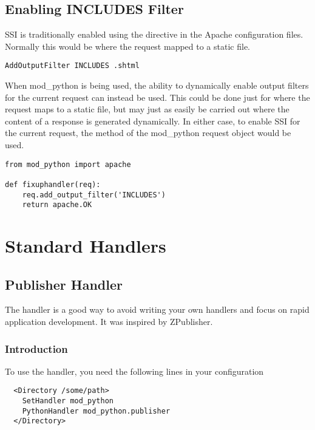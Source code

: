 \section{Enabling INCLUDES Filter\label{ssi-output-filter}}

SSI is traditionally enabled using the  directive in
the Apache configuration files. Normally this would be where the request
mapped to a static file.

\begin{verbatim}
AddOutputFilter INCLUDES .shtml
\end{verbatim}

When mod_python is being used, the ability to dynamically enable output
filters for the current request can instead be used. This could be done
just for where the request maps to a static file, but may just as easily be
carried out where the content of a response is generated dynamically. In
either case, to enable SSI for the current request, the
 method of the mod_python request object would be
used.

\begin{verbatim}
from mod_python import apache

def fixuphandler(req):
    req.add_output_filter('INCLUDES')
    return apache.OK
\end{verbatim}

\chapter{Standard Handlers\label{handlers}}

\section{Publisher Handler\label{hand-pub}}

The  handler is a good way to avoid writing your own
handlers and focus on rapid application development. It was inspired
by  ZPublisher.

\subsection{Introduction\label{hand-pub-intro}}

To use the handler, you need the following lines in your configuration
\begin{verbatim}
  <Directory /some/path>
    SetHandler mod_python 
    PythonHandler mod_python.publisher
  </Directory>
\end{verbatim}

